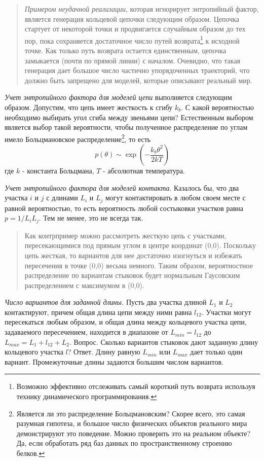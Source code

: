 \documentclass[tikz,a4paper]{scrartcl} %
\begin{document}
\begin{quote} \textit{Примером неудачной реализации}, которая игнорирует энтропийный фактор, является генерация кольцевой цепочки следующим образом. Цепочка стартует от некоторой точки и продвигается случайным образом до тех пор, пока сохраняется достаточное число путей возврата\footnote{Возможно эффективно отслеживать самый короткий путь возврата используя технику динамического программирования.} к исходной точке. Как только путь возврата остается единственным, цепочка замыкается (почти по прямой линии) с началом. Очевидно, что такая генерация дает большое число частично упорядоченных траекторий, что должно быть запрещено для моделей, которые описывают реальный мир.
\end{quote}

\textit{Учет энтропийного фактора для моделей цепи} выполняется следующим образом. Допустим, что цепь имеет жесткость к сгибу $k_b$. С какой вероятностью необходимо выбирать угол сгиба между звеньями цепи? Естественным выбором является выбор такой вероятности, чтобы полученное распределение по углам имело Больцмановское распределение\footnote{Является ли это распределение Больцмановским? Скорее всего, это самая разумная гипотеза, и большое число физических объектов реального мира демонстрируют это поведение. Можно проверить это на реальном объекте? Да, если обработать ряд баз данных по пространственному строению белков.}, то есть 
\[ p(\theta) \sim \exp(-\frac{k_b \theta^2}{2kT})  \]
где $k$ - константа Больцмана, $T$ - абсолютная температура.

\textit{Учет энтропийного фактора для моделей контакта}. Казалось бы, что два участка $i$ и $j$ с длинами $L_i$ и $L_j$ могут контактировать в любом своем месте с равной вероятностью, то есть вероятность любой состыковки участков равна $p = 1 / L_i L_j$. Тем не менее, это не всегда так. 
\begin{quote} Как контрпример можно рассмотреть жесткую цепь с участками, пересекающимися под прямым углом в центре координат (0,0). Поскольку цепь жесткая, то вариантов для нее достаточно изогнуться и избежать пересечения в точке (0,0) весьма немного. Таким образом, вероятностное распределение по вариантам стыковок будет нормальным Гаусовским распределением с максимумом в (0,0).
\end{quote}

\textit{Число вариантов для заданной длины.} Пусть два участка длиной $L_1$ и $L_2$ контактируют, причем общая длина цепи между ними равна $l_{12}$. Участки могут пересекаться любым образом, и общая длина между кольцевого участка цепи, задаваемого пересечением, находится в диапазоне от $L_{min} = l_{12}$ до $L_{max} = L_1 + l_{12} + L_2$. Вопрос. Сколько вариантов стыковок дают заданную длину кольцевого участка $l$? Ответ. Длину равную $L_{min}$ или $L_{max}$ дает только один вариант. Промежуточные длины задаются большим числом вариантов. 
\end{document}
